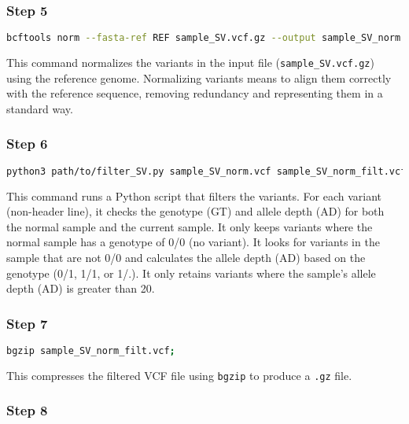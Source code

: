\subsubsection*{Step 5}

\begin{lstlisting}[breaklines=true, language=bash]
    bcftools norm --fasta-ref REF sample_SV.vcf.gz --output sample_SV_norm.vcf;
\end{lstlisting}

This command normalizes the variants in the input file (\texttt{sample\_SV.vcf.gz}) using the reference genome. Normalizing variants means to align them correctly with the reference sequence, removing redundancy and representing them in a standard way.

\subsubsection*{Step 6}

\begin{lstlisting}[breaklines=true, language=bash]
    python3 path/to/filter_SV.py sample_SV_norm.vcf sample_SV_norm_filt.vcf;
\end{lstlisting}

This command runs a Python script that filters the variants. For each variant (non-header line), it checks the genotype (GT) and allele depth (AD) for both the normal sample and the current sample.  It only keeps variants where the normal sample has a genotype of 0/0 (no variant). It looks for variants in the sample that are not 0/0 and calculates the allele depth (AD) based on the genotype (0/1, 1/1, or 1/.).
It only retains variants where the sample's allele depth (AD) is greater than 20.

\subsubsection*{Step 7}

\begin{lstlisting}[breaklines=true, language=bash]
    bgzip sample_SV_norm_filt.vcf;
\end{lstlisting}

This compresses the filtered VCF file using \texttt{bgzip} to produce a \texttt{.gz} file.

\subsubsection*{Step 8}

